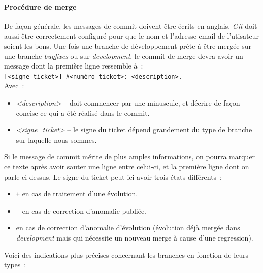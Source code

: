 \paragraph{Procédure de merge}
De façon générale, les messages de commit doivent être écrits en anglais. \emph{Git} doit aussi être correctement configuré pour que le nom et l'adresse email de l'utisateur soient les bons.
Une fois une branche de développement prête à être mergée sur une branche \emph{bugfixes} ou sur \emph{development}, le commit de merge devra avoir un message dont la première ligne ressemble à~:\\
{\tt[<signe\_ticket>] \#<numéro\_ticket>: <description>.}\\
Avec~:
\begin{itemize}
	\item\emph{<description>} -- doit commencer par une minuscule, et décrire de façon concise ce qui a été réalisé dans le commit.
	\item\emph{<signe\_ticket>} -- le signe du ticket dépend grandement du type de branche sur laquelle nous sommes.
\end{itemize}
Si le message de commit mérite de plus amples informations, on pourra marquer ce texte après avoir sauter une ligne entre celui-ci, et la première ligne dont on parle ci-dessus.
	Le signe du ticket peut ici avoir trois états différents~:
		\begin{itemize}
			\item {\tt+} en cas de traitement d'une évolution.
			\item {\tt-} en cas de correction d'anomalie publiée.
			\item {\tt*} en cas de correction d'anomalie d'évolution (évolution déjà mergée dans \emph{development} mais qui nécessite un nouveau merge à cause d'une regression).
		\end{itemize}
Voici des indications plus précises concernant les branches en fonction de leurs types~:
